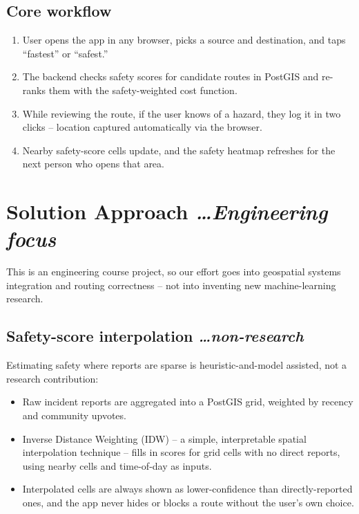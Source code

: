 \documentclass[11pt,a4paper]{article}
\newcommand{\BvrHint}[1]{%
  {\normalfont\normalsize\itshape\hfill #1}}
\begin{document}
\subsection{Core workflow}
\begin{enumerate}[leftmargin=0.7cm]
    \item User opens the app in any browser, picks a source and
    destination, and taps ``fastest'' or ``safest.''
    \item The backend checks safety scores for candidate routes in
    PostGIS and re-ranks them with the safety-weighted cost
    function.
    \item While reviewing the route, if the user knows of a
    hazard, they log it in two clicks -- location captured
    automatically via the browser.
    \item Nearby safety-score cells update, and the safety
    heatmap refreshes for the next person who opens that area.
\end{enumerate}

\section{Solution Approach %
\BvrHint{\ldots Engineering focus}}
This is an engineering course project, so our effort goes into
geospatial systems integration and routing correctness -- not into
inventing new machine-learning research.

\subsection{Safety-score interpolation %
\BvrHint{\ldots non-research}}
Estimating safety where reports are sparse is heuristic-and-model
assisted, not a research contribution:
\begin{itemize}[leftmargin=0.7cm]
    \item Raw incident reports are aggregated into a PostGIS grid,
    weighted by recency and community upvotes.
    \item Inverse Distance Weighting (IDW) -- a simple,
    interpretable spatial interpolation technique -- fills in
    scores for grid cells with no direct reports, using nearby
    cells and time-of-day as inputs.
    \item Interpolated cells are always shown as lower-confidence
    than directly-reported ones, and the app never hides or blocks
    a route without the user's own choice.
\end{itemize}
\end{document}

